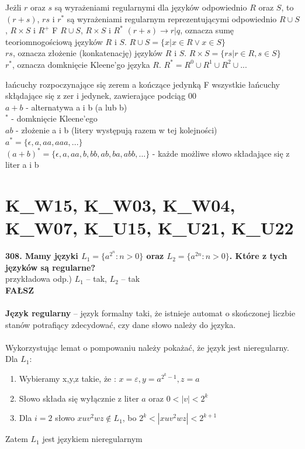 \answer
{Jeżli $r$ oraz $s$ są wyrażeniami regularnymi dla języków odpowiednio $R$ oraz $S$, to $(r+s)$, $rs$ i $r^*$ są wyrażeniami regularnym reprezentującymi odpowiednio}
{ $R \cup S$, $R \times S$ i $R^+$}
{F}
{$R \cup S$, $R \times S$ i $R^*$}
{
	$(r+s) \rightarrow r | q$, oznacza sumę teoriomnogościową języków $R$ i $S$. $R \cup S = \{x | x \in R \lor x \in S\}$ \\
	$rs$, oznacza złożenie (konkatenację) języków $R$ i $S$. $R \times S = \{rs | r \in R, s \in S\}$ \\
	$r^*$, oznacza domknięcie Kleene'go języka $R$. $R^* = R^0 \cup R^1 \cup R^2 \cup ...$  
}

{łańcuchy rozpoczynające się zerem a kończące jedynką}
{F}
{wszystkie łańcuchy skłądające się z zer i jedynek, zawierające podciąg $00$}
{\\$a + b$ - alternatywa a i b (a lub b)\\
	$^*$ - domknięcie Kleene'ego\\ 
	$ab$ - złożenie a i b (litery występują razem w tej kolejności)\\
	$a^* = \{\epsilon, a, aa, aaa, ...\}$\\
	$(a + b)^* = \{\epsilon, a, aa, b, bb, ab, ba, abb, ...\}$ - każde możliwe słowo składające się z liter a i b}

\section{K\_W15, K\_W03, K\_W04, K\_W07, K\_U15, K\_U21, K\_U22}
\textbf{308. Mamy języki $L_1 = \{ a^{2^n} : n > 0\}$ oraz $L_2 = \{ a^{2n} : n > 0\}$. Które z tych języków są regularne? }\\
przykładowa odp.) $L_1$ -- tak, $L_2$ -- tak\\
\textbf{FAŁSZ}\\\\

\textbf{Język regularny} -- język formalny taki, że istnieje automat o skończonej liczbie stanów potrafiący zdecydować, czy dane słowo należy do języka.\\\\

Wykorzystując lemat o pompowaniu należy pokażać, że język jest nieregularny. Dla $L_1$:\\
\begin{enumerate}
	\item Wybieramy x,y,z takie, że : $x=\varepsilon, y=a^{2^{k}-1}, z=a$
	\item Słowo składa się wyłącznie z liter $a$ oraz $0<|v|<2^k$
	\item Dla $i=2$ słowo $xuv^2wz \notin L_1 $, bo $2^k < |xuv^2wz| < 2^{k+1}$
\end{enumerate}
Zatem $L_1$ jest językiem nieregularnym
